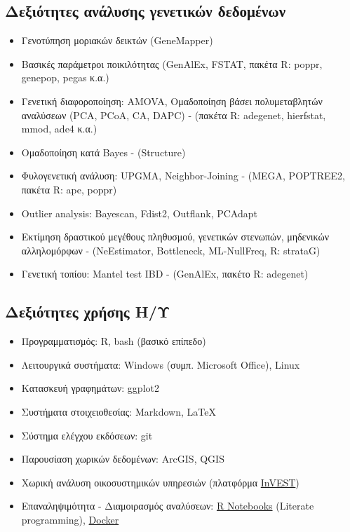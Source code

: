 \documentclass[12pt,]{scrartcl}
\begin{document}
\subsection{Δεξιότητες ανάλυσης γενετικών δεδομένων}\label{genetics}
\begin{itemize}
\vspace{-3mm}
\setlength\itemsep{-0.6em}
\item Γενοτύπηση μοριακών δεικτών (GeneMapper)
\item Βασικές παράμετροι ποικιλότητας (GenAlEx, FSTAT, πακέτα R: poppr, genepop, pegas κ.α.)
\item Γενετική διαφοροποίηση: AMOVA, Ομαδοποίηση βάσει πολυμεταβλητών αναλύσεων (PCA, PCoA, CA, DAPC) - (πακέτα R: adegenet, hierfstat, mmod, ade4 κ.α.)
\item Ομαδοποίηση κατά Bayes - (Structure)
\item Φυλογενετική ανάλυση: UPGMA, Neighbor-Joining - (MEGA, POPTREE2, πακέτα R: ape, poppr)
\item Outlier analysis: Bayescan, Fdist2, Outflank, PCAdapt
\item Εκτίμηση δραστικού μεγέθους πληθυσμού, γενετικών στενωπών, μηδενικών αλληλομόρφων - (NeEstimator, Bottleneck, ML-NullFreq, R: strataG)
\item Γενετική τοπίου: Mantel test IBD - (GenAlEx, πακέτο R: adegenet)

\end{itemize}

\subsection{Δεξιότητες χρήσης Η/Υ}\label{it}
\begin{itemize}
\vspace{-3mm}
\setlength\itemsep{-0.6em}
\item Προγραμματισμός: R, bash (βασικό επίπεδο)
\item Λειτουργικά συστήματα: Windows (συμπ. Microsoft Office), Linux
\item Κατασκευή γραφημάτων: ggplot2 %
\item Συστήματα στοιχειοθεσίας: Markdown, \LaTeX
\item Σύστημα ελέγχου εκδόσεων: git
\item Παρουσίαση χωρικών δεδομένων: ArcGIS, QGIS
\item Χωρική ανάλυση οικοσυστημικών υπηρεσιών (πλατφόρμα \href{https://naturalcapitalproject.stanford.edu/invest/}{InVEST})
\item Επαναληψιμότητα - Διαμοιρασμός αναλύσεων: \href{https://bookdown.org/yihui/rmarkdown/notebook.html}
{R Notebooks} (Literate programming), \href{https://arxiv.org/pdf/1410.0846.pdf}{Docker}
\end{itemize}
\end{document}
